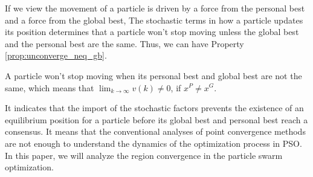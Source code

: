 If we view the movement of a particle is driven by a force from the personal best and a force from the global best, 
The stochastic terms in how a particle updates its position determines that a particle won't stop moving unless the global best and the personal best are the same.
Thus, we can have Property \ref{prop:unconverge_neq_gb}.
\begin{myprop}
\label{prop:unconverge_neq_gb}
A particle won't stop moving when its personal best and global best are not the same, 
which means that 
$ \lim_{k \rightarrow \infty} v(k) \neq 0 $, if $ x^{P} \neq x^{G} $.
\end{myprop}
It indicates that the import of the stochastic factors prevents the existence of an equilibrium position for a particle before its global best and personal best reach a consensus.
It means that the conventional analyses of point convergence methods are not enough to understand the dynamics of the optimization process in PSO.
In this paper, we will analyze the region convergence in the particle swarm optimization.